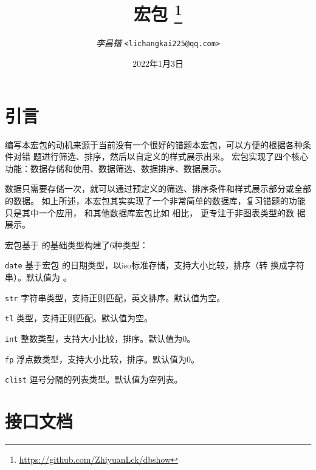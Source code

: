 \documentclass[full]{l3doc}
\begin{document}
\title{
   宏包
  \protect\footnote{\url{https://github.com/ZhiyuanLck/dbshow}}
}
\author{\textit{李昌锴} \texttt{<lichangkai225@qq.com>}}
\date{2022年1月3日}
\maketitle

{\small
\tableofcontents
}
\newpage

\begin{documentation}

\section{引言}
编写本宏包的动机来源于当前没有一个很好的错题本宏包，可以方便的根据各种条件对错
题进行筛选、排序，然后以自定义的样式展示出来。 宏包实现了四个核心
功能：数据存储和使用、数据筛选、数据排序、数据展示。

数据只需要存储一次，就可以通过预定义的筛选、排序条件和样式展示部分或全部的数据。
如上所述，本宏包其实实现了一个非常简单的数据库，复习错题的功能只是其中一个应用，
和其他数据库宏包比如  相比， 更专注于非图表类型的数
据展示。

宏包基于  的基础类型构建了6种类型：
\begin{Description}
  \item[\texttt{date}]
    基于宏包  的日期类型，以iso标准存储，支持大小比较，排序（转
    换成字符串）。默认值为 。
  \item[\texttt{str}]
    字符串类型，支持正则匹配，英文排序。默认值为空。
  \item[\texttt{tl}]
    类型，支持正则匹配。默认值为空。
  \item[\texttt{int}]
    整数类型，支持大小比较，排序。默认值为0。
  \item[\texttt{fp}]
    浮点数类型，支持大小比较，排序。默认值为0。
  \item[\texttt{clist}]
    逗号分隔的列表类型。默认值为空列表。
\end{Description}

\section{接口文档}

\end{documentation}
\end{document}
